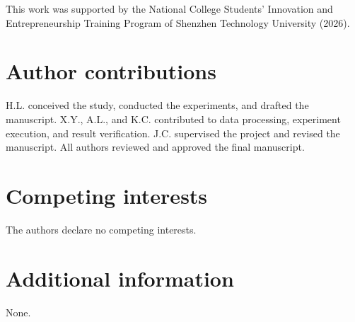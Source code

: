 \documentclass[12pt]{article}
\begin{document}
This work was supported by the National College Students' Innovation and Entrepreneurship Training Program of Shenzhen Technology University (2026).

\section*{Author contributions}

H.L. conceived the study, conducted the experiments, and drafted the manuscript. X.Y., A.L., and K.C. contributed to data processing, experiment execution, and result verification. J.C. supervised the project and revised the manuscript. All authors reviewed and approved the final manuscript.

\section*{Competing interests}

The authors declare no competing interests.

\section*{Additional information}

None.
\end{document}
